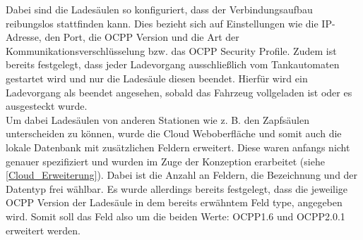\noindent Dabei sind die Ladesäulen so konfiguriert, dass der Verbindungsaufbau reibungslos stattfinden kann. Dies bezieht sich auf Einstellungen wie die IP-Adresse, den Port, die \acs{OCPP} Version und die Art der Kommunikationsverschlüsselung bzw. das OCPP Security Profile. Zudem ist bereits festgelegt, dass jeder Ladevorgang ausschließlich vom Tankautomaten gestartet wird und nur die Ladesäule diesen beendet. Hierfür wird ein Ladevorgang als beendet angesehen, sobald das Fahrzeug vollgeladen ist oder es ausgesteckt wurde.\\

\noindent Um dabei Ladesäulen von anderen Stationen wie z. B. den Zapfsäulen unterscheiden zu können, wurde die Cloud Weboberfläche und somit auch die lokale Datenbank mit zusätzlichen Feldern erweitert. Diese waren anfangs nicht genauer spezifiziert und wurden im Zuge der Konzeption erarbeitet (siehe \autoref{Cloud_Erweiterung}). Dabei ist die Anzahl an Feldern, die Bezeichnung und der Datentyp frei wählbar. Es wurde allerdings bereits festgelegt, dass die jeweilige OCPP Version der Ladesäule in dem bereits erwähntem Feld \glqq{}type\grqq{}, angegeben wird. Somit soll das Feld also um die beiden Werte: \glqq{}OCPP1.6\grqq{} und \glqq{}OCPP2.0.1\grqq{} erweitert werden.

